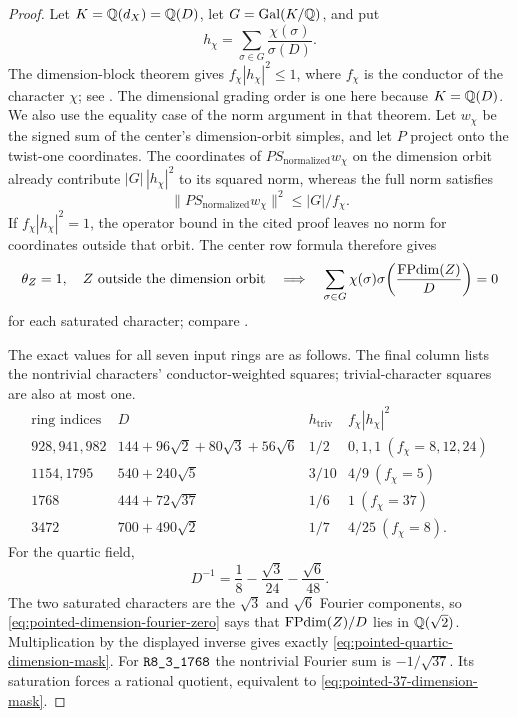 \begin{proof}
Let $K=\mathbb Q(d_X)=\mathbb Q(D)$, let $G=\operatorname{Gal}(K/\mathbb Q)$, and put
\[
 h_\chi=\sum_{\sigma\in G}\frac{\chi(\sigma)}{\sigma(D)}.
\]
The dimension-block theorem gives
$f_\chi|h_\chi|^2\leq1$, where $f_\chi$ is the conductor of the
character $\chi$; see \cite[Lemmas~2.1 and~4.1, Theorem~5.1]{SchopierayDimensionBlock}.
The dimensional grading order is one here because $K=\mathbb Q(D)$.
We also use the equality case of the norm argument in that theorem.
Let $w_\chi$ be the signed sum of the center's dimension-orbit simples,
and let $P$ project onto the twist-one coordinates.  The coordinates
of $P S_{\mathrm{normalized}}w_\chi$ on the dimension orbit already
contribute $|G|\,|h_\chi|^2$ to its squared norm, whereas the full
norm satisfies
\[
 \|P S_{\mathrm{normalized}}w_\chi\|^2\leq |G|/f_\chi.
\]
If
$f_\chi|h_\chi|^2=1$, the operator bound in the cited proof leaves
no norm for coordinates outside that orbit.  The center row formula
therefore gives
\begin{equation}\label{eq:pointed-dimension-fourier-zero}
 \theta_Z=1,\quad Z\text{ outside the dimension orbit}
 \quad\Longrightarrow\quad
 \sum_{\sigma\in G}\chi(\sigma)
             \sigma\!\left(\frac{\operatorname{FPdim}(Z)}{D}\right)=0
\end{equation}
for each saturated character; compare \cite[Section~6, equation~(30)]{SchopierayDimensionBlock}.

The exact values for all seven input rings are as follows.  The final
column lists the nontrivial characters' conductor-weighted squares;
trivial-character squares are also at most one.
\[
\begin{array}{c|l|c|l}
\text{ring indices}&D&h_{\mathrm{triv}}&f_\chi|h_\chi|^2\\\hline
928,941,982&144+96\sqrt2+80\sqrt3+56\sqrt6&1/2&0,1,1\ (f_\chi=8,12,24)\\
1154,1795&540+240\sqrt5&3/10&4/9\ (f_\chi=5)\\
1768&444+72\sqrt{37}&1/6&1\ (f_\chi=37)\\
3472&700+490\sqrt2&1/7&4/25\ (f_\chi=8).
\end{array}
\]
For the quartic field,
\[
 D^{-1}=\frac18-\frac{\sqrt3}{24}-\frac{\sqrt6}{48}.
\]
The two saturated characters are the $\sqrt3$ and $\sqrt6$ Fourier
components, so \eqref{eq:pointed-dimension-fourier-zero} says that
$\operatorname{FPdim}(Z)/D$ lies in $\mathbb Q(\sqrt2)$.  Multiplication by the displayed
inverse gives exactly \eqref{eq:pointed-quartic-dimension-mask}.
For $\sha{R8_3_1768}$ the nontrivial Fourier sum is $-1/\sqrt{37}$.
Its saturation forces a rational quotient, equivalent to
\eqref{eq:pointed-37-dimension-mask}.


\end{proof}
